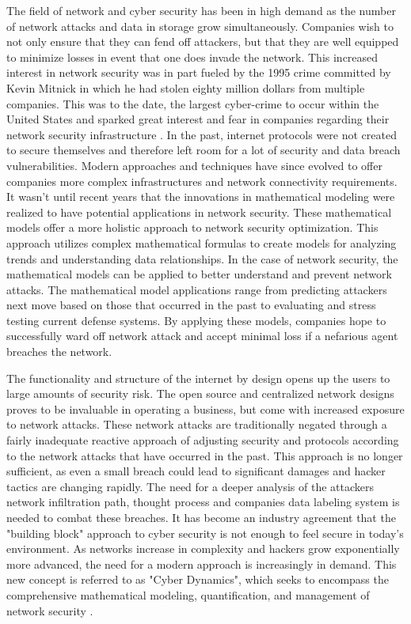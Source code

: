 \documentclass{article}
\begin{document}
The field of network and cyber security has been in high demand as the number of network attacks and data in storage grow simultaneously. Companies wish to not only ensure that they can fend off attackers, but that they are well equipped to minimize losses in event that one does invade the network. This increased interest in network security was in part fueled by the 1995 crime committed by Kevin Mitnick in which he had stolen eighty million dollars from multiple companies. This was to the date, the largest cyber-crime to occur within the United States and sparked great interest and fear in companies regarding their network security infrastructure \cite{daya2013network}. In the past, internet protocols were not created to secure themselves and therefore left room for a lot of security and data breach vulnerabilities. Modern approaches and techniques have since evolved to offer companies more complex infrastructures and network connectivity requirements. It wasn't until recent years that the innovations in mathematical modeling were realized to have potential applications in network security. These mathematical models offer a more holistic approach to network security optimization. This approach utilizes complex mathematical formulas to create models for analyzing trends and understanding data relationships. In the case of network security, the mathematical models can be applied to better understand and prevent network attacks. The mathematical model applications range from predicting attackers next move based on those that occurred in the past to evaluating and stress testing current defense systems. By applying these models, companies hope to successfully ward off network attack and accept minimal loss if a nefarious agent breaches the network. 

The functionality and structure of the internet by design opens up the users to large amounts of security risk. The open source and centralized network designs proves to be invaluable in operating a business, but come with increased exposure to network attacks. These network attacks are traditionally negated through a fairly inadequate reactive approach of adjusting security and protocols according to the network attacks that have occurred in the past. This approach is no longer sufficient, as even a small breach could lead to significant damages and hacker tactics are changing rapidly. The need for a deeper analysis of the attackers network infiltration path, thought process and companies data labeling system is needed to combat these breaches. It has become an industry agreement that the "building block" approach to cyber security is not enough to feel secure in today's environment. As networks increase in complexity and hackers grow exponentially more advanced, the need for a modern approach is increasingly in demand. This new concept is referred to as "Cyber Dynamics", which seeks to encompass the comprehensive mathematical modeling, quantification, and management of network security \cite{Xu2019}. 
\end{document}
